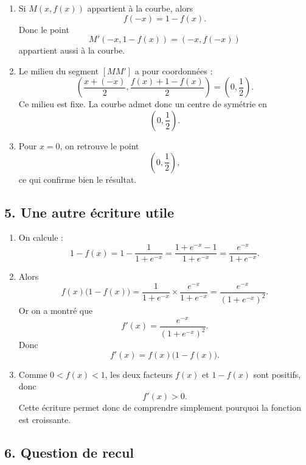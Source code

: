 \documentclass[11pt,a4paper]{article}
\begin{document}
\begin{enumerate}
    \item Si \(M(x,f(x))\) appartient à la courbe, alors
    \[
    f(-x)=1-f(x).
    \]
    Donc le point
    \[
    M'(-x,1-f(x))=(-x,f(-x))
    \]
    appartient aussi à la courbe.

    \item Le milieu du segment \([MM']\) a pour coordonnées :
    \[
    \left(\frac{x+(-x)}{2},\frac{f(x)+1-f(x)}{2}\right)
    =
    \left(0,\frac12\right).
    \]
    Ce milieu est fixe. La courbe admet donc un centre de symétrie en
    \[
    \left(0,\frac12\right).
    \]

    \item Pour \(x=0\), on retrouve le point
    \[
    \left(0,\frac12\right),
    \]
    ce qui confirme bien le résultat.
\end{enumerate}

\subsection*{5. Une autre écriture utile}

\begin{enumerate}
    \item On calcule :
    \[
    1-f(x)=1-\frac{1}{1+e^{-x}}
    =\frac{1+e^{-x}-1}{1+e^{-x}}
    =\frac{e^{-x}}{1+e^{-x}}.
    \]

    \item Alors
    \[
    f(x)\bigl(1-f(x)\bigr)
    =\frac{1}{1+e^{-x}}\times \frac{e^{-x}}{1+e^{-x}}
    =\frac{e^{-x}}{(1+e^{-x})^2}.
    \]
    Or on a montré que
    \[
    f'(x)=\frac{e^{-x}}{(1+e^{-x})^2}.
    \]
    Donc
    \[
    f'(x)=f(x)\bigl(1-f(x)\bigr).
    \]

    \item Comme \(0<f(x)<1\), les deux facteurs \(f(x)\) et \(1-f(x)\) sont positifs, donc
    \[
    f'(x)>0.
    \]
    Cette écriture permet donc de comprendre simplement pourquoi la fonction est croissante.
\end{enumerate}

\subsection*{6. Question de recul}
\end{document}
